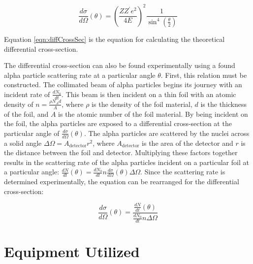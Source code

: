 \documentclass[a4paper]{article}
\begin{document}
\begin{equation}
  \frac{d\sigma}{d\Omega} (\theta) = \left( \frac{Z Z^{\prime} e^2}{4 E}
  \right)^2 \frac{1}{\sin^4 \left( \frac{\theta}{2} \right)}
\end{equation}
\label{eqn:diffCrossSec}

Equation \ref{eqn:diffCrossSec} is the equation for calculating the
theoretical differential cross-section. 

\qq The differential cross-section can also be found experimentally using a
found alpha particle scattering rate at a particular angle \( \theta \). First,
this relation must be constructed. The collimated beam of alpha particles begins
its journey with an incident rate of \( \frac{dN_0}{dt} \). This beam is then
incident on a thin foil with an atomic density of
\( n = \frac{\rho N_A d}{A} \), where \( \rho \) is the density of the foil
material, \( d \) is the thickness of the foil, and \( A \) is the atomic number
of the foil material. By being incident on the foil, the alpha particles are
exposed to a differential cross-section at the particular angle of
\( \frac{d\sigma}{d\Omega} (\theta) \). The alpha particles are scattered by the
nuclei across a solid angle \( \Delta \Omega = {A_{\text{detector}}}{r^2} \),
where \( A_{\text{detector}} \) is the area of the detector and \( r \) is the
distance between the foil and detector. Multiplying these factors together
results in the scattering rate of the alpha particles incident on a particular
foil at a particular angle: \( \frac{dN}{dt} (\theta) = \frac{dN_0}{dt} n
\frac{d\sigma}{d\Omega} (\theta) \Delta \Omega \). Since the scattering rate is
determined experimentally, the equation can be rearranged for the differential
cross-section:

\begin{equation}
  \frac{d\sigma}{d\Omega} (\theta) = \frac{\frac{dN}{dt}
    (\theta)}{\frac{dN_0}{dt} n \Delta \Omega}
\end{equation}
\label{eqn:expDiffCrossSec}


\qq 

\section{Equipment Utilized}
\end{document}
